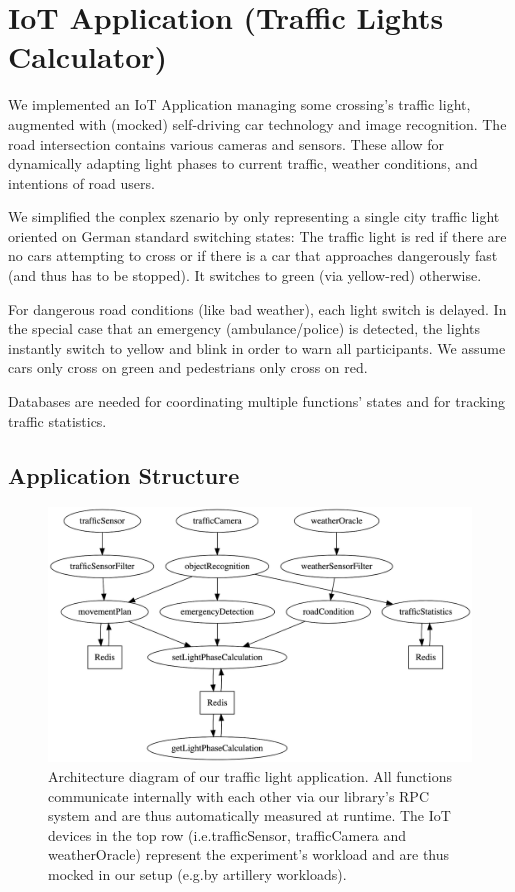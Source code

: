 \documentclass[../main.tex]{subfiles}
\begin{document}
\section{IoT Application (Traffic Lights Calculator)}\label{sec:iot}

We implemented an IoT Application managing some crossing's traffic light, 
augmented with (mocked) self-driving car technology and image recognition. 
The road intersection contains various cameras and sensors. 
These allow for dynamically adapting light phases to current traffic, 
weather conditions, and intentions of road users. 

We simplified the conplex szenario by only representing a single city traffic light oriented on German standard switching states:
The traffic light is red if there are no cars attempting to cross 
or if there is a car that approaches dangerously fast (and thus has to be stopped). 
It switches to green (via yellow-red) otherwise. 

For dangerous road conditions (like bad weather), each light switch is delayed. 
In the special case that an emergency (ambulance/police) is detected, 
the lights instantly switch to yellow and blink 
in order to warn all participants. 
We assume cars only cross on green and pedestrians only cross on red.

Databases are needed for coordinating multiple functions' states
and for tracking traffic statistics.


\subsection{Application Structure}\label{ssec:iotApplicationStructure}

\begin{figure}
\begin{center}
  \includegraphics[width=\linewidth,keepaspectratio]{./iot-architecture-diagram.png}
\end{center}
\caption[IoT Architecture Diagram]{%
  Architecture diagram of our traffic light application.
  All functions communicate internally with each other via our library's RPC system
  and are thus automatically measured at runtime.
  The IoT devices in the top row (i.e.\@ trafficSensor, trafficCamera and weatherOracle) 
  represent the experiment's workload and are thus mocked in our setup (e.g.\@ by artillery workloads).%
}%
\label{fig:iotArchitectureDiagram}
\end{figure}
\end{document}
